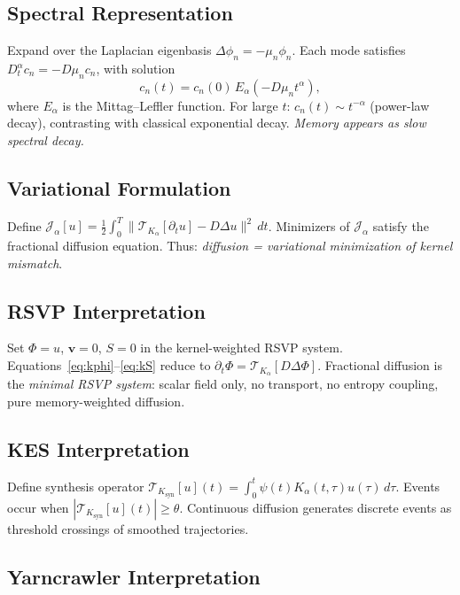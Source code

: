 \documentclass[12pt]{article}
\begin{document}
\subsection{Spectral Representation}

Expand over the Laplacian eigenbasis $\Delta\phi_n = -\mu_n\phi_n$.
Each mode satisfies $D_t^\alpha c_n = -D\mu_n c_n$, with solution
\[
  c_n(t) = c_n(0)\,E_\alpha(-D\mu_n t^\alpha),
\]
where $E_\alpha$ is the Mittag--Leffler function. For large $t$:
$c_n(t) \sim t^{-\alpha}$ (power-law decay), contrasting with classical
exponential decay. \emph{Memory appears as slow spectral decay.}

\subsection{Variational Formulation}

Define
$\mathcal{J}_\alpha[u] = \tfrac{1}{2}\int_0^T\!\|\mathcal{T}_{K_\alpha}[\partial_t u] - D\Delta u\|^2\,dt$.
Minimizers of $\mathcal{J}_\alpha$ satisfy the fractional diffusion equation.
Thus: \emph{diffusion = variational minimization of kernel mismatch}.

\subsection{RSVP Interpretation}

Set $\Phi = u$, $\mathbf{v} = 0$, $S = 0$ in the kernel-weighted RSVP
system. Equations~\eqref{eq:kphi}--\eqref{eq:kS} reduce to
$\partial_t\Phi = \mathcal{T}_{K_\alpha}[D\Delta\Phi]$.
Fractional diffusion is the \emph{minimal RSVP system}: scalar field only,
no transport, no entropy coupling, pure memory-weighted diffusion.

\subsection{KES Interpretation}

Define synthesis operator $\mathcal{T}_{K_{\mathrm{syn}}}[u](t) = \int_0^t
\psi(t)K_\alpha(t,\tau)u(\tau)\,d\tau$. Events occur when
$|\mathcal{T}_{K_{\mathrm{syn}}}[u](t)| \geq \theta$. Continuous diffusion
generates discrete events as threshold crossings of smoothed trajectories.

\subsection{Yarncrawler Interpretation}
\end{document}
